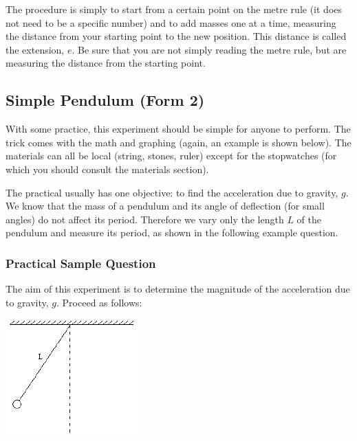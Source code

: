 The procedure is simply to start from a certain point on the metre rule (it does not
need to be a specific number) and to add masses one at a time, measuring the distance
from your starting point to the new position. This distance is called the extension, $e$. Be
sure that you are not simply reading the metre rule, but are measuring the distance from
the starting point.

\subsection{Simple Pendulum (Form 2)}

With some practice, this experiment should be simple for anyone to perform. The
trick comes with the math and graphing (again, an example is shown below). The
materials can all be local (string, stones, ruler) except for the stopwatches (for which you
should consult the materials section).

The practical usually has one objective: to find the acceleration due to gravity, $g$.
We know that the mass of a pendulum and its angle of deflection (for small angles) do
not affect its period. Therefore we vary only the length $L$ of the pendulum and measure
its period, as shown in the following example question.

\subsubsection{Practical Sample Question}

The aim of this experiment is to determine the magnitude of the acceleration due to
gravity, $g$. Proceed as follows:

\begin{center}
\includegraphics{./img/pendulum.png}
\end{center}


